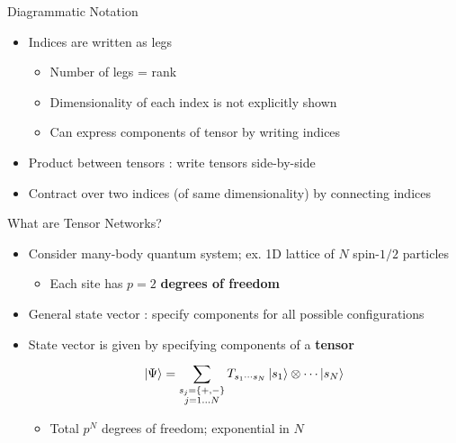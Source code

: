 \documentclass{beamer}
\begin{document}
\begin{frame}{Diagrammatic Notation}
	\begin{itemize}
		\item Indices are written as legs
		\begin{itemize}
		\item Number of legs = rank
		\item Dimensionality of each index is not explicitly shown
		\item Can express components of tensor by writing indices
		\end{itemize}
	\item Product between tensors : write tensors side-by-side
	\item Contract over two indices (of same dimensionality) by connecting indices
	\end{itemize}
\end{frame}

\begin{frame}{What are Tensor Networks?}
	\begin{itemize}
	\item Consider many-body quantum system; ex. 1D lattice of $N$ spin-$1/2$ particles
		\begin{itemize}
			\item Each site has $p=2$ \textbf{degrees of freedom}
		\end{itemize}
	\item General state vector : specify components for all possible configurations
	\item State vector is given by specifying components of a \textbf{tensor}
	\[
		\ket{\Psi } =\sum_{\substack{s_{j}=\{+,-\}\\j=1\dots N}}^{} T_{s_{1}\cdots s_{N}}\ket{s_{1}}\otimes \cdots \ket{s_{N}}
	\]
	\begin{itemize}
	\item Total ${ p^{N} }$ degrees of freedom; exponential in ${ N }$
	\end{itemize}
	\end{itemize}	
\end{frame}
\end{document}
